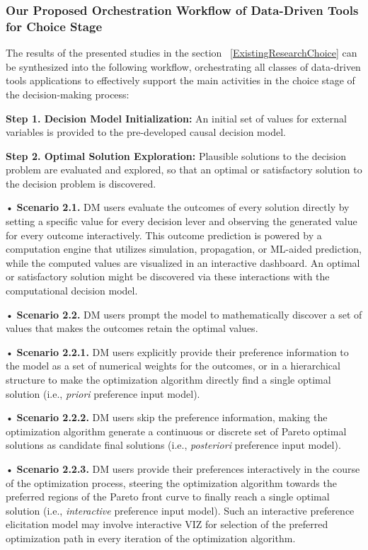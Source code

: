 \documentclass{sfuthesis}
\begin{document}
\subsubsection{Our Proposed Orchestration Workflow of Data-Driven Tools for Choice Stage}
The results of the presented studies in the section ~\ref{ExistingResearchChoice} can be synthesized into the following workflow, orchestrating all classes of data-driven tools applications to effectively support the main activities in the choice stage of the decision-making process:\par
\textbf{Step 1. Decision Model Initialization:} An initial set of values for external variables is provided to the pre-developed causal decision model.\par
\textbf{Step 2. Optimal Solution Exploration:} Plausible solutions to the decision problem are evaluated and explored, so that an optimal or satisfactory solution to the decision problem is discovered.\par 
{
\setlength{\leftskip}{0.5cm}
\noindent•	\textbf{Scenario 2.1.} DM users evaluate the outcomes of every solution directly by setting a specific value for every decision lever and observing the generated value for every outcome interactively. This outcome prediction is powered by a computation engine that utilizes simulation, propagation, or ML-aided prediction, while the computed values are visualized in an interactive dashboard. An optimal or satisfactory solution might be discovered via these interactions with the computational decision model.\par
\noindent•	\textbf{Scenario 2.2.} DM users prompt the model to mathematically discover a set of values that makes the outcomes retain the optimal values.\par
}
{
\setlength{\leftskip}{1cm}
\noindent•	\textbf{Scenario 2.2.1.} DM users explicitly provide their preference information to the model as a set of numerical weights for the outcomes, or in a hierarchical structure to make the optimization algorithm directly find a single optimal solution (i.e., \textit{priori} preference input model).\par
\noindent•	\textbf{Scenario 2.2.2.} DM users skip the preference information, making the optimization algorithm generate a continuous or discrete set of Pareto optimal solutions as candidate final solutions (i.e., \textit{posteriori} preference input model).\par
\noindent•	\textbf{Scenario 2.2.3.} DM users provide their preferences interactively in the course of the optimization process, steering the optimization algorithm towards the preferred regions of the Pareto front curve to finally reach a single optimal solution (i.e., \textit{interactive} preference input model). Such an interactive preference elicitation model may involve interactive VIZ for selection of the preferred optimization path in every iteration of the optimization algorithm.\par
}
\end{document}
